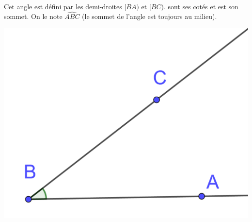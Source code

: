 \documentclass[12pt,a4paper]{article}
\date{}
\title{}
\begin{document}






\vspace*{-0.2cm}



\vspace*{-0.2cm}



\begin{myex}
	\begin{multicols}{2}
		Cet angle est défini par les demi-droites $[BA)$ et $[BC)$. \hspace*{4cm} sont ses cotés et \hspace{1cm} est son sommet.
		On le note $\widehat{ABC}$ (le sommet de l'angle est toujours au milieu).
		
		\includegraphics[scale=0.2]{ex1}
	\end{multicols}
\end{myex}
\end{document}
